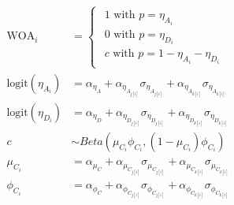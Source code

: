 $$
\begin{aligned}

\text{WOA}_i &= \begin{cases} 
    \begin{array}{l}
    1 \text{ with } p = \eta_{A_i}\\
    0 \text{ with } p = \eta_{D_i}  \\
    c \text{ with } p = 1 - \eta_{A_i} - \eta_{D_i}
    \end{array} 
\end{cases} \\

\text{logit}(\eta_{A_i}) &= \alpha_{\eta_A} + \alpha_{\eta_{A_{j[i]}}} \sigma_{\eta_{A_{j[i]}}} + \alpha_{\eta_{A_{k[i]}}} \sigma_{\eta_{A_{k[i]}}} \\

\text{logit}(\eta_{D_i}) &= \alpha_{\eta_D} + \alpha_{\eta_{D_{j[i]}}} \sigma_{\eta_{D_{j[i]}}} + \alpha_{\eta_{D_{k[i]}}} \sigma_{\eta_{D_{k[i]}}} \\

c &\sim Beta(\mu_{C_i} \phi_{C_i}, (1 - \mu_{C_i}) \phi_{C_i}) \\

\mu_{C_i} &= \alpha_{\mu_C} + \alpha_{\mu_{C_{j[i]}}} \sigma_{\mu_{C_{j[i]}}} + \alpha_{\mu_{C_{k[i]}}} \sigma_{\mu_{C_{k[i]}}} \\
\phi_{C_i} &= \alpha_{\phi_C} + \alpha_{\phi_{C_{j[i]}}} \sigma_{\phi_{C_{j[i]}}} + \alpha_{\phi_{C_{k[i]}}} \sigma_{\phi_{C_{k[i]}}}

\end{aligned}
$$
